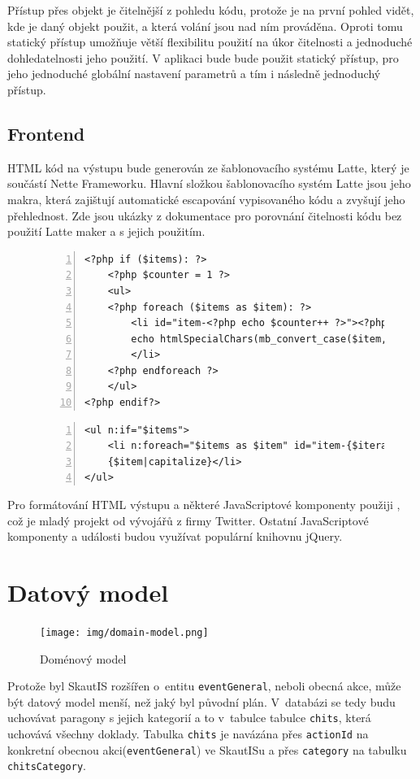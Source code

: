 \documentclass[thesis=B,czech]{FITthesis}[2011/06/14]
\begin{document}
Přístup přes objekt je čitelnější z pohledu kódu, protože je na první pohled vidět, kde je daný objekt použit, a která volání jsou nad ním prováděna. Oproti tomu statický přístup umožňuje větší flexibilitu použití na úkor čitelnosti a jednoduché dohledatelnosti jeho použití. V aplikaci bude bude použit statický přístup, pro jeho jednoduché globální nastavení parametrů a tím i následně jednoduchý přístup.

\subsection{Frontend}
HTML kód na výstupu bude generován ze šablonovacího systému Latte, který je součástí Nette Frameworku. Hlavní složkou šablonovacího systém Latte jsou jeho makra, která zajištují automatické escapování vypisovaného kódu a zvyšují jeho přehlednost. Zde jsou ukázky z dokumentace \cite{latte} pro porovnání čitelnosti kódu bez použití Latte maker a s jejich použitím.

\begin{figure}[h]
\begin{lstlisting}[caption=Vypsání seznamu položek bez použití Latte, numbers=left]
<?php if ($items): ?>
    <?php $counter = 1 ?>
    <ul>
    <?php foreach ($items as $item): ?>
        <li id="item-<?php echo $counter++ ?>"><?php
        echo htmlSpecialChars(mb_convert_case($item, MB_CASE_TITLE)) ?>
        </li>
    <?php endforeach ?>
    </ul>
<?php endif?>
\end{lstlisting}

\begin{lstlisting}[caption=Vypsání seznamu položek pomocí Latte, numbers=left]
<ul n:if="$items">
    <li n:foreach="$items as $item" id="item-{$iterator->counter}">
    {$item|capitalize}</li>
</ul>
\end{lstlisting}
\end{figure}

Pro formátování HTML výstupu a některé JavaScriptové komponenty použiji \cite{twBootstrap}, což je mladý projekt od vývojářů z firmy Twitter. Ostatní JavaScriptové komponenty a události budou využívat populární knihovnu jQuery\cite{jquery}.

\section{Datový model}
\begin{figure}[h] \centering
 	\caption[Doménový model]{Doménový model}\label{fig:domain-model}
	\texttt{[image: img/domain-model.png]}
\end{figure}
Protože byl SkautIS rozšířen o~entitu \texttt{eventGeneral}, neboli obecná akce, může být datový model menší, než jaký byl původní plán. V~databázi se tedy budu uchovávat paragony s jejich kategorií a to v~tabulce tabulce \texttt{chits}, která uchovává všechny doklady. Tabulka \texttt{chits} je navázána přes \texttt{actionId} na konkretní obecnou akci(\texttt{eventGeneral}) ve SkautISu a přes \texttt{category} na tabulku \texttt{chitsCategory}.
\end{document}
